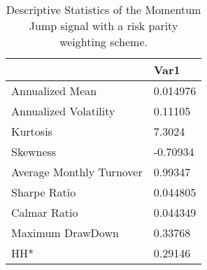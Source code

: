 \begin{table}[H]
\centering
\begin{tabular}{ll}
\hline& Var1 \\ 
\hline 
Annualized Mean & 0.014976 \\ 
Annualized Volatility & 0.11105 \\ 
Kurtosis & 7.3024 \\ 
Skewness & -0.70934 \\ 
Average Monthly Turnover & 0.99347 \\ 
Sharpe Ratio & 0.044805 \\ 
Calmar Ratio & 0.044349 \\ 
Maximum DrawDown & 0.33768 \\ 
HH* & 0.29146 \\ 
\hline
\end{tabular}
\caption{Descriptive Statistics of the Momentum Jump signal with a risk parity weighting scheme.}
\label{MOMJUMPRP}
\end{table}